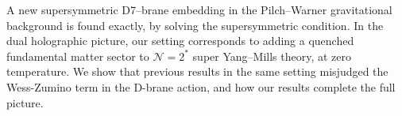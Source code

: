 A new supersymmetric D7–brane embedding in the Pilch–Warner gravitational background is found exactly, by solving the supersymmetric condition. 
In the dual holographic picture, our setting corresponds to adding a quenched fundamental matter sector to  $\mathcal{N}=2^*$  super Yang–Mills theory, at zero temperature. We show that previous results in the same setting misjudged the Wess-Zumino term in the D-brane action, and how our results complete the full picture.
